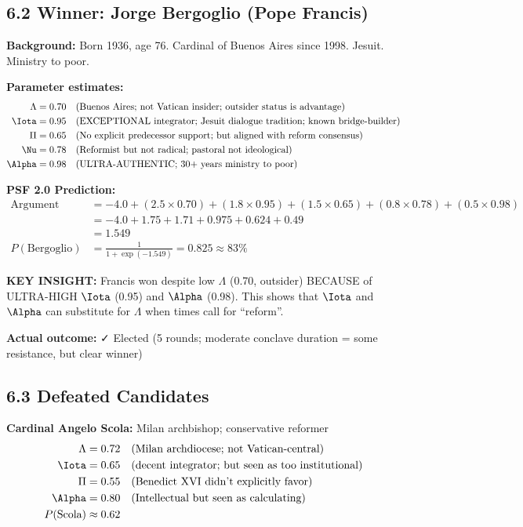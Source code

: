 \documentclass[11pt]{article}
\begin{document}
\subsection{6.2 Winner: Jorge Bergoglio (Pope Francis)}

\textbf{Background:} Born 1936, age 76. Cardinal of Buenos Aires since 1998. Jesuit. Ministry to poor.

\textbf{Parameter estimates:}
\begin{align*}
\Lambda &= 0.70 \quad \text{(Buenos Aires; not Vatican insider; outsider status is advantage)} \\
\Iota &= 0.95 \quad \text{(EXCEPTIONAL integrator; Jesuit dialogue tradition; known bridge-builder)} \\
\Pi &= 0.65 \quad \text{(No explicit predecessor support; but aligned with reform consensus)} \\
\Nu &= 0.78 \quad \text{(Reformist but not radical; pastoral not ideological)} \\
\Alpha &= 0.98 \quad \text{(ULTRA-AUTHENTIC; 30+ years ministry to poor)}
\end{align*}

\textbf{PSF 2.0 Prediction:}
\begin{align*}
\text{Argument} &= -4.0 + (2.5 \times 0.70) + (1.8 \times 0.95) + (1.5 \times 0.65) + (0.8 \times 0.78) + (0.5 \times 0.98) \\
&= -4.0 + 1.75 + 1.71 + 0.975 + 0.624 + 0.49 \\
&= 1.549 \\
P(\text{Bergoglio}) &= \frac{1}{1 + \exp(-1.549)} = 0.825 \approx 83\%
\end{align*}

\textbf{KEY INSIGHT:} Francis won despite low $\Lambda$ (0.70, outsider) BECAUSE of ULTRA-HIGH $\Iota$ (0.95) and $\Alpha$ (0.98). This shows that $\Iota$ and $\Alpha$ can substitute for $\Lambda$ when times call for ``reform''.

\textbf{Actual outcome:} ✓ Elected (5 rounds; moderate conclave duration = some resistance, but clear winner)

\subsection{6.3 Defeated Candidates}

\textbf{Cardinal Angelo Scola:} Milan archbishop; conservative reformer
\begin{align*}
\Lambda &= 0.72 \quad \text{(Milan archdiocese; not Vatican-central)} \\
\Iota &= 0.65 \quad \text{(decent integrator; but seen as too institutional)} \\
\Pi &= 0.55 \quad \text{(Benedict XVI didn't explicitly favor)} \\
\Alpha &= 0.80 \quad \text{(Intellectual but seen as calculating)} \\
P(\text{Scola}) &\approx 0.62
\end{align*}
\end{document}
